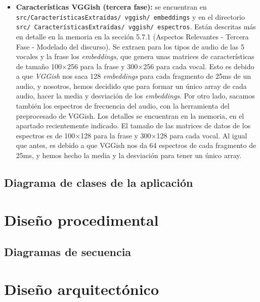 \begin{itemize}
\item \textbf{Características VGGish (tercera fase):} se encuentran en \texttt{src/CaracterísticasExtraídas/ vggish/ embeddings} y en el directorio \texttt{src/ CaracterísticasExtraídas/ vggish/ espectros}. Están descritas más en detalle en la memoria en la sección 5.7.1 (Aspectos Relevantes - Tercera Fase - Modelado del discurso). Se extraen para los tipos de audio de las 5 vocales y la frase los \textit{embeddings}, que genera unas matrices de características de tamaño 100$\times$256 para la frase y 300$\times$256 para cada vocal. Esto es debido a que \textit{VGGish} nos saca 128 \textit{embeddings} para cada fragmento de 25ms de un audio, y nosotros, hemos decidido que para formar un único array de cada audio, hacer la media y desviación de los \textit{embeddings}. Por otro lado, sacamos también los espectros de frecuencia del audio, con la herramienta del preprocesado de VGGish. Los detalles se encuentran en la memoria, en el apartado recientemente indicado. El tamaño de las matrices de datos de los espectros es de 100$\times$128 para la frase y 300$\times$128 para cada vocal. Al igual que antes, es debido a que VGGish nos da 64 espectros de cada fragmento de 25ms, y hemos hecho la media y la desviación para tener un único array.
	
\end{itemize} 

\subsection{Diagrama de clases de la aplicación}




\section{Diseño procedimental}
\subsection{Diagramas de secuencia}


\section{Diseño arquitectónico}


